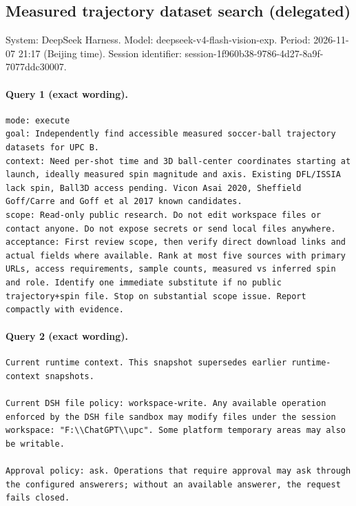 \documentclass[UTF8,10pt]{ctexart}
\begin{document}
\subsection*{Measured trajectory dataset search (delegated)}
\noindent System: DeepSeek Harness. Model: deepseek-v4-flash-vision-exp. Period: 2026-11-07 21:17 (Beijing time). Session identifier: session-1f960b38-9786-4d27-8a9f-7077ddc30007.

\paragraph{Query 1 (exact wording).}
\begin{Verbatim}[breaklines=true,breakanywhere=true,fontsize=\scriptsize,frame=single,framesep=2pt]
mode: execute
goal: Independently find accessible measured soccer-ball trajectory datasets for UPC B.
context: Need per-shot time and 3D ball-center coordinates starting at launch, ideally measured spin magnitude and axis. Existing DFL/ISSIA lack spin, Ball3D access pending. Vicon Asai 2020, Sheffield Goff/Carre and Goff et al 2017 known candidates.
scope: Read-only public research. Do not edit workspace files or contact anyone. Do not expose secrets or send local files anywhere.
acceptance: First review scope, then verify direct download links and actual fields where available. Rank at most five sources with primary URLs, access requirements, sample counts, measured vs inferred spin and role. Identify one immediate substitute if no public trajectory+spin file. Stop on substantial scope issue. Report compactly with evidence.
\end{Verbatim}

\paragraph{Query 2 (exact wording).}
\begin{Verbatim}[breaklines=true,breakanywhere=true,fontsize=\scriptsize,frame=single,framesep=2pt]
Current runtime context. This snapshot supersedes earlier runtime-context snapshots.

Current DSH file policy: workspace-write. Any available operation enforced by the DSH file sandbox may modify files under the session workspace: "F:\\ChatGPT\\upc". Some platform temporary areas may also be writable.

Approval policy: ask. Operations that require approval may ask through the configured answerers; without an available answerer, the request fails closed.
\end{Verbatim}
\end{document}
